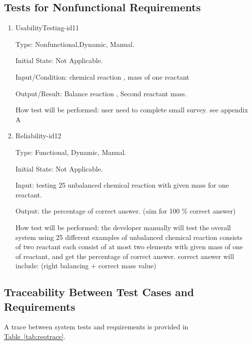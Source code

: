 \documentclass[12pt, titlepage]{article}
\begin{document}
\subsection{Tests for Nonfunctional Requirements}

\begin{enumerate}

\item{ UsabilityTesting-id11\\}

Type:  Nonfunctional,Dynamic, Manual.
					
Initial State:  Not Applicable.
					
Input/Condition: chemical reaction ,  mass of one reactant
					
Output/Result: Balance reaction , Second reactant mass.
					
How test will be performed: user need to complete small survey. see appendix A 
					
\item{Reliability-id12\\}

Type: Functional, Dynamic, Manual.
					
Initial State:  Not Applicable.
					
Input: testing 25 unbalanced chemical reaction with given mass for one reactant.
					
Output: the percentage of correct answer. (aim for 100 \% correct answer) 
					
How test will be performed: the developer manually will test the overall system using 25 different examples of unbalanced chemical reaction consists of two reactant each consist of at most two elements with given mass of one of reactant, and get the percentage of correct answer. correct answer will include: (right balancing + correct mass value) 

\end{enumerate}

\subsection{Traceability Between Test Cases and Requirements}

A trace between system tests and requirements is provided in 
\hyperref[tab:reqtrace]{Table~\ref*{tab:reqtrace}}.
\end{document}
